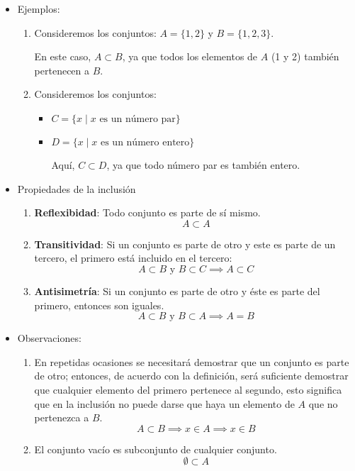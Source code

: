 \begin{itemize}
	
	\item Ejemplos:
	
	\begin{enumerate}
		\item Consideremos los conjuntos: \(A = \{1, 2\}\) y \(B = \{1, 2, 3\}\).
		
		En este caso, \(A \subset B\), ya que todos los elementos de \(A\) (1 y 2) también pertenecen a \(B\).
		
		\item Consideremos los conjuntos:
		
		\begin{itemize}
			\item \(C = \{x \mid x \mbox{ es un número par}\}\)
			\item \(D = \{x \mid x \mbox{ es un número entero}\}\)
			
			Aquí, \(C \subset D\), ya que todo número par es también entero.
		\end{itemize}
	\end{enumerate}
	
	\item Propiedades de la inclusión
	\begin{enumerate}[label=\roman*)]
		\item \textbf{Reflexibidad}: Todo conjunto es parte de sí mismo.
		\[ A \subset A \]
		\item \textbf{Transitividad}: Si un conjunto es parte de otro y este es parte de un tercero, el primero está incluido en el tercero:
		\[ A \subset B \mbox{ y } B \subset C \implies A \subset C \]
		\item \textbf{Antisimetría}: Si un conjunto es parte de otro y éste es parte del primero, entonces son iguales.
		\[ A \subset B \mbox{ y } B \subset A \implies A = B \]
	\end{enumerate}
	
	\item Observaciones:
	
	\begin{enumerate}
		\item En repetidas ocasiones se necesitará demostrar que un conjunto es parte de otro; entonces, de acuerdo con la definición, será suficiente demostrar que cualquier elemento del primero pertenece al segundo, esto significa que en la inclusión no puede darse que haya un elemento de $A$ que no pertenezca a $B$.
		\[ A \subset B \implies x \in A \implies x \in B \]
		
		\item El conjunto vacío es subconjunto de cualquier conjunto.
		\[ \emptyset \subset A \]
	\end{enumerate}
\end{itemize}

